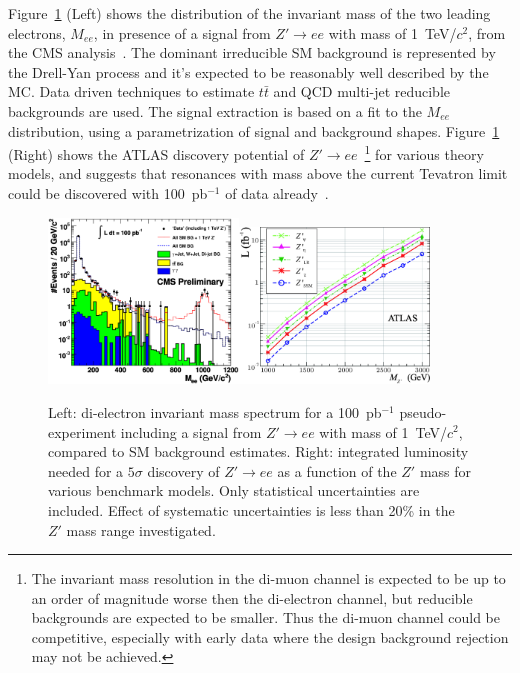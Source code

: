 \documentclass{cimento}
\begin{document}
Figure~\ref{fig:MeeAndZPrimeDisc} (Left) shows the distribution of 
the invariant mass of the two leading electrons, $M_{ee}$, in presence of 
a signal from $Z' \rightarrow ee$ with mass of 1~TeV/$c^2$, 
from the CMS analysis~\cite{HEEPNOTE}. The dominant irreducible SM background 
is represented by the Drell-Yan process and it's expected to be 
reasonably well described by the MC. Data driven techniques to estimate $t\bar{t}$ and QCD multi-jet
reducible backgrounds are used. The signal extraction is based on a fit 
to the $M_{ee}$ distribution, using a parametrization of signal and 
background shapes. Figure~\ref{fig:MeeAndZPrimeDisc} (Right)
shows the ATLAS discovery potential of 
$Z' \rightarrow ee$~\footnote{The invariant mass resolution 
in the di-muon channel is expected to be up to an 
order of magnitude worse then the di-electron channel, but reducible backgrounds
are expected to be smaller. Thus the di-muon channel could be competitive, 
especially with early data where the design background rejection may not be 
achieved.} for various theory 
models, and suggests that resonances with mass 
above the current Tevatron limit could be discovered with 
100~pb$^{-1}$ of data already~\cite{DiLepResonancesATLAS}. 

\begin{figure}[htbp] 
\centering
\includegraphics[width=0.45\textwidth]{st_mass_all_withZPrime_ALLTOPO.eps}\includegraphics[width=0.45\textwidth]{fig9L.eps}
\caption{Left: di-electron invariant mass spectrum for a 
100~pb$^{-1}$ pseudo-experiment including a signal from 
$Z' \rightarrow ee$ with mass of 1~TeV/$c^2$, 
compared to SM background estimates. Right: integrated 
luminosity needed for a $5\sigma$ discovery of $Z' \rightarrow ee$
as a function of the $Z'$ mass for various benchmark models. Only 
statistical uncertainties are included. 
Effect of systematic uncertainties is less than 20\% in the $Z'$ mass
range investigated.}
\label{fig:MeeAndZPrimeDisc}
\end{figure}
\end{document}
